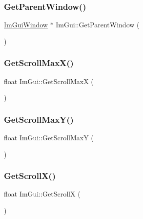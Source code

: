 \mbox{\label{namespace_im_gui_afd2f3d9a23ef5cb331d060a0d77e2cde}} 
\subsubsection{\texorpdfstring{Get\+Parent\+Window()}{GetParentWindow()}}
{\footnotesize\ttfamily \mbox{\hyperlink{struct_im_gui_window}{Im\+Gui\+Window}} $\ast$ Im\+Gui\+::\+Get\+Parent\+Window (\begin{DoxyParamCaption}{ }\end{DoxyParamCaption})}

\mbox{\label{namespace_im_gui_af472cb090157c22e65a0aa1662b9f3d0}} 
\subsubsection{\texorpdfstring{Get\+Scroll\+Max\+X()}{GetScrollMaxX()}}
{\footnotesize\ttfamily float Im\+Gui\+::\+Get\+Scroll\+MaxX (\begin{DoxyParamCaption}{ }\end{DoxyParamCaption})}

\mbox{\label{namespace_im_gui_ab34c0d5c63908a7ff50923151730f76a}} 
\subsubsection{\texorpdfstring{Get\+Scroll\+Max\+Y()}{GetScrollMaxY()}}
{\footnotesize\ttfamily float Im\+Gui\+::\+Get\+Scroll\+MaxY (\begin{DoxyParamCaption}{ }\end{DoxyParamCaption})}

\mbox{\label{namespace_im_gui_a6f88335d87da3be81dc6e24cb1812923}} 
\subsubsection{\texorpdfstring{Get\+Scroll\+X()}{GetScrollX()}}
{\footnotesize\ttfamily float Im\+Gui\+::\+Get\+ScrollX (\begin{DoxyParamCaption}{ }\end{DoxyParamCaption})}

